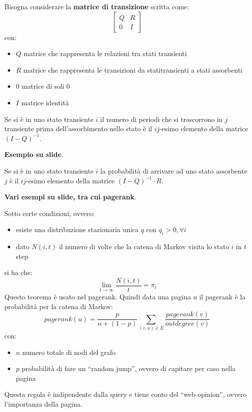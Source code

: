 \message{ !name(modprob.tex)}\documentclass[a4paper,12pt, oneside]{book}
\begin{document}
\begin{definizione}
  Bisogna considerare la \textbf{matrice di transizione} scritta come:
  \[
    \left[
      \begin{matrix}
        Q & R\\
        0 & I
      \end{matrix}
    \right]
  \]
  \newpage
  con:
  \begin{itemize}
    \item $Q$ matrice che rappresenta le relazioni tra stati transienti
    \item $R$ matrice che rappresenta le transizioni da  statitransienti a stati
    assorbenti
    \item $0$ matrice di soli 0
    \item $I$ matrice identità
\end{itemize}
\end{definizione}
\begin{definizione}
  Se si è in uno stato transiente $i$ il numero di periodi che si trascorrono
  in $j$ transiente prima dell'assorbimento nello stato è il $ij$-esimo
  elemento della matrice $(I-Q)^{-1}$.
\end{definizione}
\textbf{Esempio su slide}.
\begin{definizione}
    Se si è in uno stato transiente $i$ la probabilità di arrivare ad uno stato
    assorbente $j$ è il $ij$-esimo elemento della matrice $(I-Q)^{-1}\cdot R$.
\end{definizione}
\textbf{Vari esempi su slide, tra cui pagerank}.
\begin{teorema}
  Sotto certe condizioni, ovvero:
  \begin{itemize}
    \item esiste una distribuzione stazionaria unica $q$ con $q_i>0,\forall i$
    \item dato $N(i,t)$ il numero di volte che la catena di Markov visita lo
    stato $i$ in $t$ step
  \end{itemize}
  si ha che:
  \[\lim_{t\to\infty}\frac{N(i,t)}{t}=\pi_i\]
  Questo teorema è usato nel pagerank. Quindi data una pagina $u$ il pagerank è
  la probabilità per la catena di Markov:
  \[pagerank(u)=\frac{p}{n+(1-p)}\sum_{(v,u)\in
      E}\frac{pagerank(v)}{outdegree(v)}\]
  con:
  \begin{itemize}
    \item $n$ numero totale di nodi del grafo
    \item $p$ probabilità di fare un ``random jump'', ovvero di capitare per
    caso nella pagina
  \end{itemize}
  Questa regola è indipendente dalla query e tiene conto del ``web opinion'',
  ovvero l'importanza della pagina.
\end{teorema}
\end{document}
